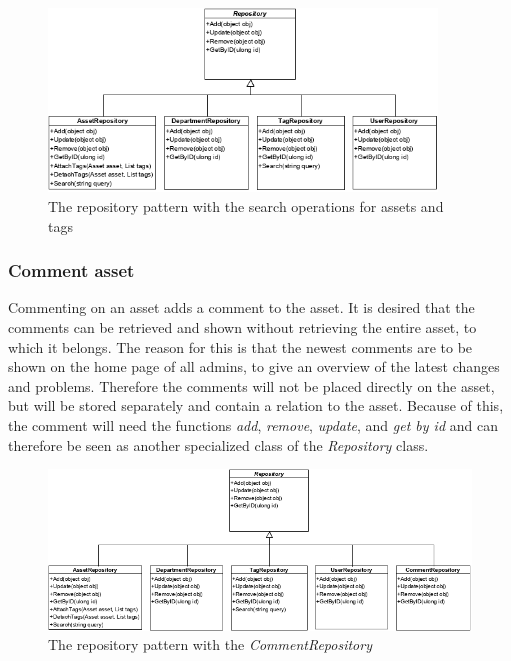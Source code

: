 \begin{figure}[H]
    \centering
    \includegraphics[width=0.92\textwidth]{figures/FunctionComponent/Repository_pattern_with_search.png}
    \caption{The repository pattern with the search operations for assets and tags}
    \label{fig:RepositoryPatternWithSearch}
\end{figure}

\subsubsection{Comment asset}
Commenting on an asset adds a comment to the asset. It is desired that the comments can be retrieved and shown without retrieving the entire asset, to which it belongs. The reason for this is that the newest comments are to be shown on the home page of all admins, to give an overview of the latest changes and problems. Therefore the comments will not be placed directly on the asset, but will be stored separately and contain a relation to the asset. Because of this, the comment will need the functions \textit{add}, \textit{remove}, \textit{update}, and \textit{get by id} and can therefore be seen as another specialized class of the \textit{Repository} class.

\begin{figure}[H]
    \centering
    \includegraphics[width=1\textwidth]{figures/FunctionComponent/CommentRepository.png}
    \caption{The repository pattern with the \textit{CommentRepository}}
    \label{fig:RepositoryPatternWithCommentRepository}
\end{figure}

